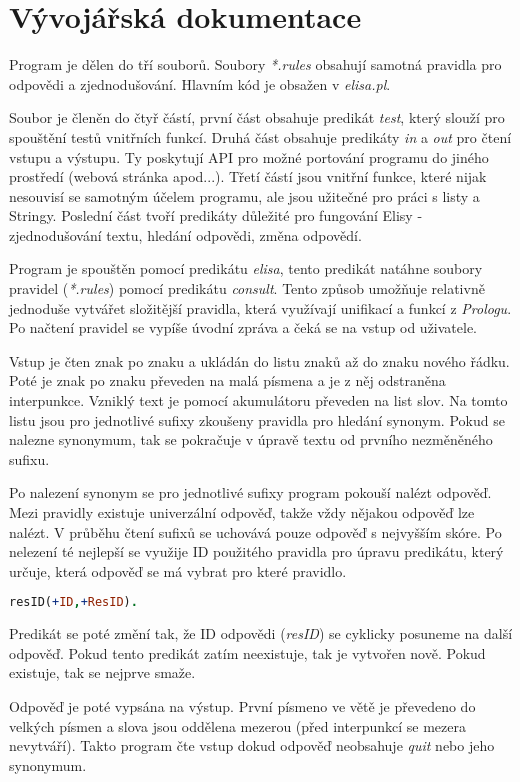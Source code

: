 \documentclass[12pt,a4paper,titlepage]{scrartcl}
\begin{document}
	\section{Vývojářská dokumentace}
	Program je dělen do tří souborů. Soubory \textit{*.rules} obsahují samotná pravidla pro odpovědi a zjednodušování. Hlavním kód je obsažen v \textit{elisa.pl}.
	\par
	Soubor je členěn do čtyř částí, první část obsahuje predikát \textit{test}, který slouží pro spouštění testů vnitřních funkcí. Druhá část obsahuje predikáty \textit{in} a \textit{out} pro čtení vstupu a výstupu. Ty poskytují API pro možné portování programu do jiného prostředí (webová stránka apod...). Třetí částí jsou vnitřní funkce, které nijak nesouvisí se samotným účelem programu, ale jsou užitečné pro práci s listy a Stringy. Poslední část tvoří predikáty důležité pro fungování Elisy - zjednodušování textu, hledání odpovědi, změna odpovědí.
	\par
	Program je spouštěn pomocí predikátu \textit{elisa}, tento predikát natáhne soubory pravidel (\textit{*.rules}) pomocí predikátu \textit{consult}. Tento způsob umožňuje relativně jednoduše vytvářet složitější pravidla, která využívají unifikací a funkcí z \textit{Prologu}. Po načtení pravidel se vypíše úvodní zpráva a čeká se na vstup od uživatele.
	\par
	Vstup je čten znak po znaku a ukládán do listu  znaků až do znaku nového řádku. Poté je znak po znaku převeden na malá písmena a je z něj odstraněna interpunkce. Vzniklý text je pomocí akumulátoru převeden na list slov. Na tomto listu jsou pro jednotlivé sufixy zkoušeny pravidla pro hledání synonym. Pokud se nalezne synonymum, tak se pokračuje v úpravě textu od prvního nezměněného sufixu.
	\par
	Po nalezení synonym se pro jednotlivé sufixy program pokouší nalézt odpověď. Mezi pravidly existuje univerzální odpověď, takže vždy nějakou odpověď lze nalézt. V průběhu čtení sufixů se uchovává pouze odpověď s nejvyšším skóre. Po nelezení té nejlepší se využije ID použitého pravidla pro úpravu predikátu, který určuje, která odpověď se má vybrat pro které pravidlo.
	\begin{lstlisting}[language=Prolog]
	resID(+ID,+ResID).
	\end{lstlisting} \textit{} Predikát se poté změní tak, že ID odpovědi (\textit{resID}) se cyklicky posuneme na další odpověď. Pokud tento predikát zatím neexistuje, tak je vytvořen nově. Pokud existuje, tak se nejprve smaže.
	\par
	Odpověď je poté vypsána na výstup. První písmeno ve větě je převedeno do velkých písmen a slova jsou oddělena mezerou (před interpunkcí se mezera nevytváří). Takto program čte vstup dokud odpověď neobsahuje \textit{quit} nebo jeho synonymum.
\end{document}
